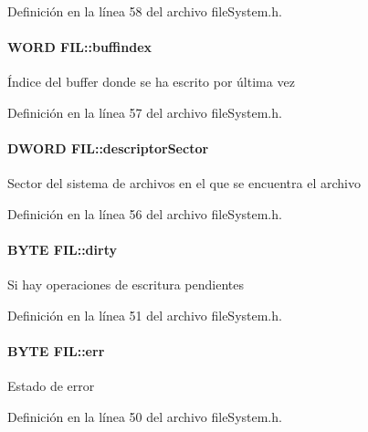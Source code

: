 Definición en la línea 58 del archivo file\+System.\+h.

\hypertarget{structFIL_a5fb6271e3cc261b9f811bb8860cb6110}{
\paragraph[{buffindex}]{\setlength{\rightskip}{0pt plus 5cm}W\+O\+R\+D F\+I\+L\+::buffindex}}\label{structFIL_a5fb6271e3cc261b9f811bb8860cb6110}
Índice del buffer donde se ha escrito por última vez 

Definición en la línea 57 del archivo file\+System.\+h.

\hypertarget{structFIL_a043930088c6fdc5e523500b833106476}{
\paragraph[{descriptor\+Sector}]{\setlength{\rightskip}{0pt plus 5cm}D\+W\+O\+R\+D F\+I\+L\+::descriptor\+Sector}}\label{structFIL_a043930088c6fdc5e523500b833106476}
Sector del sistema de archivos en el que se encuentra el archivo 

Definición en la línea 56 del archivo file\+System.\+h.

\hypertarget{structFIL_a32847fe875861954ec3dc750d332a194}{
\paragraph[{dirty}]{\setlength{\rightskip}{0pt plus 5cm}B\+Y\+T\+E F\+I\+L\+::dirty}}\label{structFIL_a32847fe875861954ec3dc750d332a194}
Si hay operaciones de escritura pendientes 

Definición en la línea 51 del archivo file\+System.\+h.

\hypertarget{structFIL_aea440945db26de9c4a88065c0c887fda}{
\paragraph[{err}]{\setlength{\rightskip}{0pt plus 5cm}B\+Y\+T\+E F\+I\+L\+::err}}\label{structFIL_aea440945db26de9c4a88065c0c887fda}
Estado de error 

Definición en la línea 50 del archivo file\+System.\+h.

